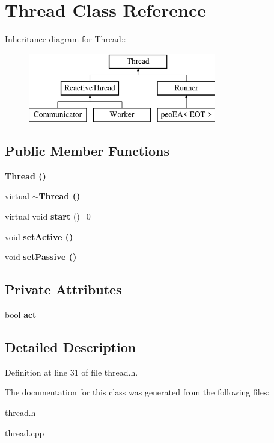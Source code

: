 \section{Thread Class Reference}
\label{class_thread}
Inheritance diagram for Thread::\begin{figure}[H]
\begin{center}
\leavevmode
\includegraphics[height=3cm]{class_thread}
\end{center}
\end{figure}
\subsection*{Public Member Functions}
\begin{CompactItemize}
\item 
\bf{Thread} ()\label{class_thread_95c703fb8f2f27cb64f475a8c940864a}

\item 
virtual \bf{$\sim$Thread} ()\label{class_thread_37d9edd3a1a776cbc27dedff949c9726}

\item 
virtual void \textbf{start} ()=0\label{class_thread_c667c1d8fd7243d669043e3dd762b567}

\item 
void \bf{set\-Active} ()\label{class_thread_e197c46f8f62ecce6d2a7fe95bdc5b38}

\item 
void \bf{set\-Passive} ()\label{class_thread_20632ffe9ddfa2a478afb0c84dc1096b}

\end{CompactItemize}
\subsection*{Private Attributes}
\begin{CompactItemize}
\item 
bool \bf{act}\label{class_thread_1b155d63bca3096ac4a1d039aea83c7c}

\end{CompactItemize}


\subsection{Detailed Description}




Definition at line 31 of file thread.h.

The documentation for this class was generated from the following files:\begin{CompactItemize}
\item 
thread.h\item 
thread.cpp\end{CompactItemize}
